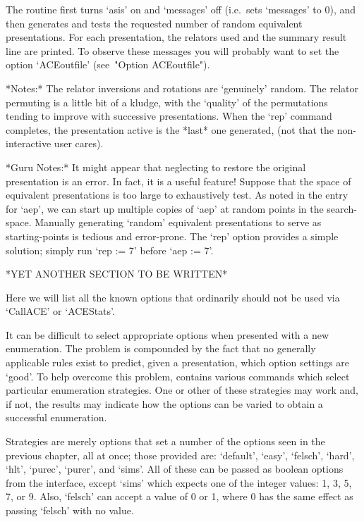 The routine first  turns  `asis'  on  and  `messages'  off  (i.e.~sets
`messages' to 0), and then generates and tests the requested number of
random equivalent presentations. For each  presentation, the  relators
used and the  summary  result  line  are  printed.  To  observe  these
messages you  will  probably  want  to  set  the  option  `ACEoutfile'
(see~"Option ACEoutfile").

*Notes:*
The relator inversions and rotations are \lq{}genuinely'  random.  The
relator permuting is a little bit of a kludge, with the  \lq{}quality'
of the permutations tending to improve with successive  presentations.
When the `rep' command  completes,  the  presentation  active  is  the
*last* one generated, (not that the non-interactive user cares).

*Guru Notes:*
It might appear that neglecting to restore the  original  presentation
is an error. In fact, it is a useful feature! Suppose that  the  space
of equivalent presentations is too  large  to  exhaustively  test.  As
noted in the entry for `aep', we can start up multiple copies of `aep'
at random points in the  search-space.  Manually  generating  `random'
equivalent presentations to serve as starting-points  is  tedious  and
error-prone. The `rep' option provides a simple solution;  simply  run
`rep := 7' before `aep := 7'.


*YET ANOTHER SECTION TO BE WRITTEN*

Here we will list all the known {\ACE} options that ordinarily  should
not be used via `CallACE' or `ACEStats'.


It can be difficult to select appropriate options when presented  with
a new enumeration. The problem is  compounded  by  the  fact  that  no
generally applicable rules exist to  predict,  given  a  presentation,
which option settings are \lq{}good'. To help overcome  this  problem,
{\ACE} contains various commands which select  particular  enumeration
strategies. One or other of these strategies may work and, if not, the
results may indicate how  the  options  can  be  varied  to  obtain  a
successful enumeration.

Strategies are merely options that set a number of the options seen in
the previous chapter, all at  once;  those  provided  are:  `default',
`easy', `felsch', `hard', `hlt', `purec', `purer', and `sims'. All  of
these can be passed as boolean  options  from  the  {\ACE}  interface,
except `sims' which expects one of the integer values: 1, 3, 5, 7,  or
9. Also, `felsch' can accept a value of 0 or 1, where 0 has  the  same
effect as passing `felsch' with no value.

